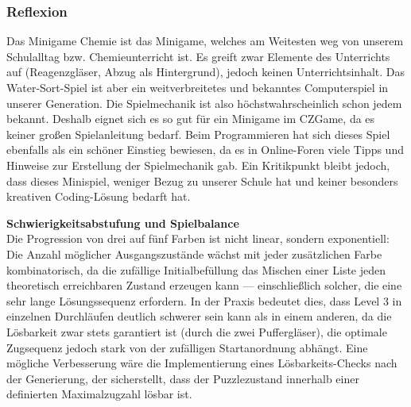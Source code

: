 \subsubsection{Reflexion}
Das Minigame Chemie ist das Minigame, welches am Weitesten weg von unserem Schulalltag bzw. Chemieunterricht ist. Es greift zwar Elemente des Unterrichts auf (Reagenzgläser, Abzug als Hintergrund), jedoch keinen Unterrichtsinhalt. Das Water-Sort-Spiel ist aber ein weitverbreitetes und bekanntes Computerspiel in unserer Generation. Die Spielmechanik ist also höchstwahrscheinlich schon jedem bekannt.
Deshalb eignet sich es so gut für ein Minigame im CZGame, da es keiner großen Spielanleitung bedarf. Beim Programmieren hat sich dieses Spiel ebenfalls als ein schöner Einstieg bewiesen, da es in Online-Foren viele Tipps und Hinweise zur Erstellung der Spielmechanik gab.
Ein Kritikpunkt bleibt jedoch, dass dieses Minispiel, weniger Bezug zu unserer Schule hat und keiner besonders kreativen Coding-Lösung bedarft hat.

\textbf{Schwierigkeitsabstufung und Spielbalance} \\
Die Progression von drei auf fünf Farben ist nicht linear, sondern exponentiell: Die Anzahl möglicher Ausgangszustände wächst mit jeder zusätzlichen Farbe kombinatorisch, da die zufällige Initialbefüllung das Mischen einer Liste jeden theoretisch erreichbaren Zustand erzeugen kann — einschließlich solcher, die eine sehr lange Lösungssequenz erfordern.
In der Praxis bedeutet dies, dass Level 3 in einzelnen Durchläufen deutlich schwerer sein kann als in einem anderen, da die Lösbarkeit zwar stets garantiert ist (durch die zwei Puffergläser), die optimale Zugsequenz jedoch stark von der zufälligen Startanordnung abhängt.
Eine mögliche Verbesserung wäre die Implementierung eines Lösbarkeits-Checks nach der Generierung, der sicherstellt, dass der Puzzlezustand innerhalb einer definierten Maximalzugzahl lösbar ist.

